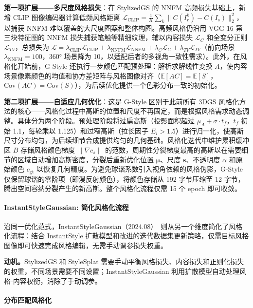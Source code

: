 \textbf{第一项扩展——多尺度风格损失}：在 StylizedGS 的 NNFM 高频损失基础上，新增 CLIP 图像编码器计算低频风格距离 $\mathcal{L}_{\text{CLIP}} = \frac{1}{K}\sum_k \|C(I_r^k) - C(I_s)\|_2^2$，以捕获 NNFM 难以覆盖的大尺度图案和整体构图。高频风格仍沿用 VGG-16 第三块特征图的 NNFM 损失捕获笔触等精细纹理，辅以内容损失 $\mathcal{L}_C$ 和全变分正则 $\mathcal{L}_{TV}$，总损失为 $\mathcal{L} = \lambda_{\text{CLIP}}\mathcal{L}_{\text{CLIP}} + \lambda_{\text{NNFM}}\mathcal{L}_{\text{NNFM}} + \lambda_C\mathcal{L}_C + \lambda_{TV}\mathcal{L}_{TV}$（前向场景 $\lambda_{\text{NNFM}}{=}100$，360° 场景降为 10，以适配后者的多视角一致性需求）。此外，在风格化开始前，G-Style 还执行一步颜色匹配预处理：解析求解线性变换 $A$，使内容场景像素颜色的均值和协方差矩阵与风格图像对齐（$\mathbb{E}[AC]=\mathbb{E}[S]$，$\text{Cov}(AC)=\text{Cov}(S)$），为后续优化提供一个色彩分布一致的初始化。

\textbf{第二项扩展——自适应几何优化}：这是 G-Style 区别于此前所有 3DGS 风格化方法的核心——风格化过程中高斯的位置和尺度不再固定，而是根据风格需求动态调整。具体分为两个阶段。预处理阶段将过扁高斯（投影面积超过 $\mu_A + \sigma \cdot t_f$，$t_f$ 初始 1.1，每轮乘以 1.125）和过窄高斯（拉长因子 $E_i > 1.5$）进行归一化，使高斯尺寸分布均匀，为后续细节合成提供均匀的几何基础。风格化迭代中维护累积缓冲区 $B$ 存储风格颜色梯度 $\|\nabla c_s\|$ 的范数，周期性分裂梯度最高的高斯以在需要细节的区域自动增加高斯密度，分裂后重新优化位置 $\boldsymbol{\mu}$、尺度 $\mathbf{s}$、不透明度 $\alpha$ 和原始颜色 $c_{\text{gt}}$ 以恢复几何精度。为避免球谐系数引入视角依赖的风格伪影，G-Style 仅保留球谐的零阶项（即漫反射颜色），将颜色存储从 192 字节压缩至 12 字节，腾出空间容纳分裂产生的新高斯。整个风格化流程仅需 15 个 epoch 即可收敛。

\paragraph{InstantStyleGaussian: 简化风格化流程}

沿同一优化范式，InstantStyleGaussian（2024.08）~\cite{2408_04249}则从另一个维度简化了风格化流程：结合 InstantStyle 扩散模型和改进的迭代数据集更新策略，仅需目标风格图像即可快速完成风格编辑，无需手动调参损失权重。

\textbf{动机。}StylizedGS 和 StyleSplat 需要手动平衡风格损失、内容损失和正则化损失的权重，不同场景需要不同设置；InstantStyleGaussian 利用扩散模型自动处理风格-内容权衡，消除了手动调参。

\paragraph{分布匹配风格化}

